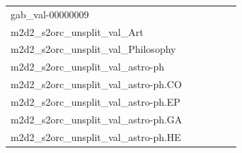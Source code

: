 \documentclass[dvipsnames]{article}
\begin{document}
\begin{appendix}
{\begin{longtable}{m{6cm}m{1.7cm}m{1.7cm}m{1.7cm}m{1.7cm}m{1.7cm}}
	gab\_val-00000009  & \colorbox[HTML]{ffffe5}{\makebox[\mywidth][c]{34.13}} & \colorbox[HTML]{84cb7d}{\makebox[\mywidth][c]{31.34}} & \colorbox[HTML]{fbfdd4}{\makebox[\mywidth][c]{32.36}} & \colorbox[HTML]{b4e091}{\makebox[\mywidth][c]{31.50}} & \colorbox[HTML]{77c578}{\makebox[\mywidth][c]{31.30}}\\
	m2d2\_s2orc\_unsplit\_val\_Art  & \colorbox[HTML]{f7fcbe}{\makebox[\mywidth][c]{20.07}} & \colorbox[HTML]{e0f2a8}{\makebox[\mywidth][c]{19.80}} & \colorbox[HTML]{ffffe5}{\makebox[\mywidth][c]{21.88}} & \colorbox[HTML]{ddf1a6}{\makebox[\mywidth][c]{19.78}} & \colorbox[HTML]{77c578}{\makebox[\mywidth][c]{19.44}}\\
	m2d2\_s2orc\_unsplit\_val\_Philosophy  & \colorbox[HTML]{ddf1a6}{\makebox[\mywidth][c]{14.80}} & \colorbox[HTML]{e0f2a8}{\makebox[\mywidth][c]{14.82}} & \colorbox[HTML]{ffffe5}{\makebox[\mywidth][c]{16.77}} & \colorbox[HTML]{c5e799}{\makebox[\mywidth][c]{14.69}} & \colorbox[HTML]{77c578}{\makebox[\mywidth][c]{14.47}}\\
	m2d2\_s2orc\_unsplit\_val\_astro-ph  & \colorbox[HTML]{eef8b2}{\makebox[\mywidth][c]{11.70}} & \colorbox[HTML]{eef8b2}{\makebox[\mywidth][c]{11.70}} & \colorbox[HTML]{ffffe5}{\makebox[\mywidth][c]{13.18}} & \colorbox[HTML]{cdeb9d}{\makebox[\mywidth][c]{11.52}} & \colorbox[HTML]{77c578}{\makebox[\mywidth][c]{11.33}}\\
	m2d2\_s2orc\_unsplit\_val\_astro-ph.CO  & \colorbox[HTML]{e9f6af}{\makebox[\mywidth][c]{11.47}} & \colorbox[HTML]{ecf7b1}{\makebox[\mywidth][c]{11.49}} & \colorbox[HTML]{ffffe5}{\makebox[\mywidth][c]{12.90}} & \colorbox[HTML]{d9f0a3}{\makebox[\mywidth][c]{11.37}} & \colorbox[HTML]{77c578}{\makebox[\mywidth][c]{11.15}}\\
	m2d2\_s2orc\_unsplit\_val\_astro-ph.EP  & \colorbox[HTML]{e5f5ac}{\makebox[\mywidth][c]{12.76}} & \colorbox[HTML]{e0f2a8}{\makebox[\mywidth][c]{12.73}} & \colorbox[HTML]{ffffe5}{\makebox[\mywidth][c]{14.28}} & \colorbox[HTML]{bbe395}{\makebox[\mywidth][c]{12.60}} & \colorbox[HTML]{77c578}{\makebox[\mywidth][c]{12.45}}\\
	m2d2\_s2orc\_unsplit\_val\_astro-ph.GA  & \colorbox[HTML]{eef8b2}{\makebox[\mywidth][c]{11.70}} & \colorbox[HTML]{eef8b2}{\makebox[\mywidth][c]{11.70}} & \colorbox[HTML]{ffffe5}{\makebox[\mywidth][c]{13.18}} & \colorbox[HTML]{cdeb9d}{\makebox[\mywidth][c]{11.52}} & \colorbox[HTML]{77c578}{\makebox[\mywidth][c]{11.33}}\\
	m2d2\_s2orc\_unsplit\_val\_astro-ph.HE  & \colorbox[HTML]{f1f9b4}{\makebox[\mywidth][c]{11.85}} & \colorbox[HTML]{e5f5ac}{\makebox[\mywidth][c]{11.77}} & \colorbox[HTML]{ffffe5}{\makebox[\mywidth][c]{13.29}} & \colorbox[HTML]{c2e698}{\makebox[\mywidth][c]{11.62}} & \colorbox[HTML]{77c578}{\makebox[\mywidth][c]{11.46}}\\

\end{longtable}}
\end{appendix}
\end{document}
